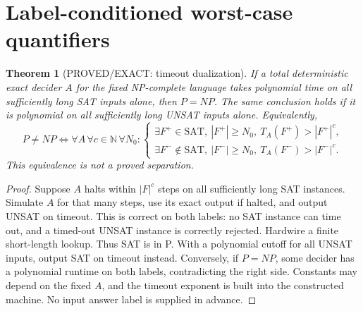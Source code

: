 \documentclass[11pt]{article}
\newtheorem{theorem}{Theorem}
\begin{document}
\section{Label-conditioned worst-case quantifiers}
\begin{theorem}[PROVED/EXACT: timeout dualization]
If a total deterministic exact decider $A$ for the fixed NP-complete language takes polynomial time on all sufficiently long SAT inputs \emph{alone}, then $P=NP$. The same conclusion holds if it is polynomial on all sufficiently long UNSAT inputs \emph{alone}. Equivalently,
\[
P\ne NP \iff \forall A\,\forall c\in\mathbb N\,\forall N_0:
\begin{cases}
\exists F^+\in\mathrm{SAT},\ |F^+|\ge N_0,\ T_A(F^+)>|F^+|^c,\\
\exists F^-\notin\mathrm{SAT},\ |F^-|\ge N_0,\ T_A(F^-)>|F^-|^c .
\end{cases}
\tag{5}
\]
This equivalence is not a proved separation.
\end{theorem}
\begin{proof}
Suppose $A$ halts within $|F|^c$ steps on all sufficiently long SAT instances. Simulate $A$ for that many steps, use its exact output if halted, and output UNSAT on timeout. This is correct on both labels: no SAT instance can time out, and a timed-out UNSAT instance is correctly rejected. Hardwire a finite short-length lookup. Thus SAT is in P. With a polynomial cutoff for all UNSAT inputs, output SAT on timeout instead. Conversely, if $P=NP$, some decider has a polynomial runtime on both labels, contradicting the right side. Constants may depend on the fixed $A$, and the timeout exponent is built into the constructed machine. No input answer label is supplied in advance.
\end{proof}
\end{document}
